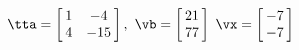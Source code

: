 {$\tta = \left[\hskip -3pt \begin{array}{cc} 1&-4\\  4&-15\end {array} \hskip -3pt
 \right] ,$
 \quad
$\vb =\left[\hskip -3pt \begin{array}{c} 21\\  77\end {array} \hskip -3pt
 \right]$ 
}
{$\vx = \left[\hskip -3pt \begin{array}{c} -7\\  -7\end {array} \hskip -3pt
 \right]$}
 